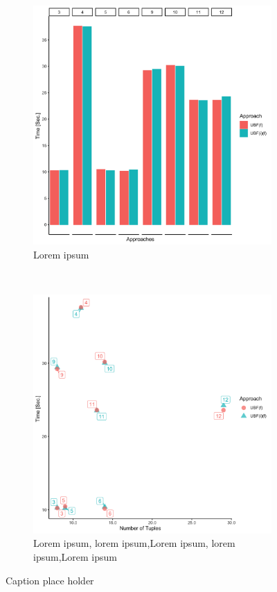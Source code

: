 \begin{figure}[t!]
    \centering
    \begin{subfigure}[t]{0.5\textwidth}
        \centering
        \includegraphics[scale=0.09]{figs/plots/emp-ubf-f.png}
        \caption{Lorem ipsum}
    \end{subfigure}%
    ~ 
    \begin{subfigure}[t]{0.5\textwidth}
        \centering
        \includegraphics[scale=0.09]{figs/plots/emp-ubf-f-scatter.png}
        \caption{Lorem ipsum, lorem ipsum,Lorem ipsum, lorem ipsum,Lorem ipsum}
    \end{subfigure}
    \caption{Caption place holder}
\end{figure}

